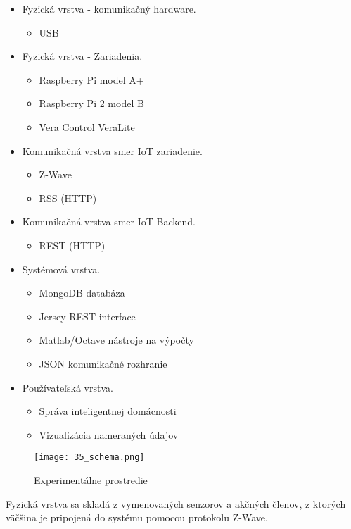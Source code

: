 \begin{itemize}
\begin{itemize}
\begin{itemize}
       \end{itemize}     
  \end{itemize}  
\item Fyzická vrstva - komunikačný hardware.
  \begin{itemize}
    \item USB
  \end{itemize}    
\item Fyzická vrstva - Zariadenia.
  \begin{itemize}
    \item Raspberry Pi model A+
    \item Raspberry Pi 2 model B    
    \item Vera Control VeraLite
  \end{itemize}  
\item Komunikačná vrstva smer IoT zariadenie.
  \begin{itemize}
    \item Z-Wave
    \item RSS (HTTP)
  \end{itemize}    
\item Komunikačná vrstva smer IoT Backend.
  \begin{itemize}
    \item REST (HTTP)
  \end{itemize} 
\item Systémová vrstva.
  \begin{itemize}
    \item MongoDB databáza 
    \item Jersey REST interface
    \item Matlab/Octave  nástroje na výpočty     
    \item JSON komunikačné rozhranie
  \end{itemize}           
\item Používateľská vrstva.
  \begin{itemize}
    \item Správa inteligentnej domácnosti
    \item Vizualizácia nameraných údajov    
  \end{itemize}         
\end{itemize}
\begin{figure}[h]
\centering
\texttt{[image: 35\_schema.png]}
\caption{Experimentálne prostredie}
\label{35_schema}
\end{figure} 
Fyzická vrstva sa skladá z vymenovaných senzorov a akčných členov, z ktorých väčšina je pripojená do systému pomocou protokolu Z-Wave. \\
